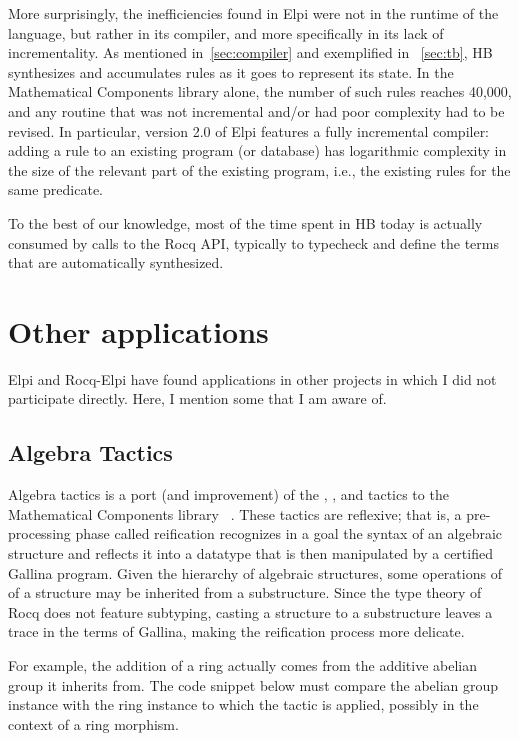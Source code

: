 \documentclass{these-ISSS}
\begin{document}
More surprisingly, the inefficiencies found in Elpi were not in the runtime of
the language, but rather in its compiler, and more specifically in its lack of
incrementality. As mentioned in~\cref{sec:compiler} and exemplified in
~\cref{sec:tb}, HB synthesizes and accumulates rules as it goes to represent
its state. In the Mathematical Components library alone, the number of such
rules reaches 40,000, and any routine that was not incremental and/or had poor
complexity had to be revised. In particular, version 2.0 of Elpi features a
fully incremental compiler: adding a rule to an existing program (or database)
has logarithmic complexity in the size of the relevant part of the existing
program, i.e., the existing rules for the same predicate.

To the best of our knowledge, most of the time spent in HB today is actually
consumed by calls to the Rocq API, typically to typecheck and define the terms
that are automatically synthesized.

\newpage\section{Other applications}


Elpi and Rocq-Elpi have found applications in other projects in which I did not
participate directly. Here, I mention some that I am aware of.

\subsection{Algebra Tactics}

Algebra tactics is a port (and improvement) of the , ,
and  tactics to the Mathematical Components library
~\cite{sakaguchi:LIPIcs.ITP.2022.29}. These tactics are reflexive; that is, a
pre-processing phase called reification recognizes in a goal the syntax of an
algebraic structure and reflects it into a datatype that is then manipulated by
a certified Gallina program. Given the hierarchy of algebraic structures, some operations
of of a structure may be inherited from a substructure. Since the type
theory of Rocq does not feature subtyping, casting a structure to a
substructure leaves a trace in the terms of Gallina, making the reification
process more delicate.

For example, the addition of a ring actually comes from the additive abelian
group it inherits from. The code snippet below must compare the abelian group
instance  with the ring instance  to which the tactic is
applied, possibly in the context  of a ring morphism.
\end{document}
